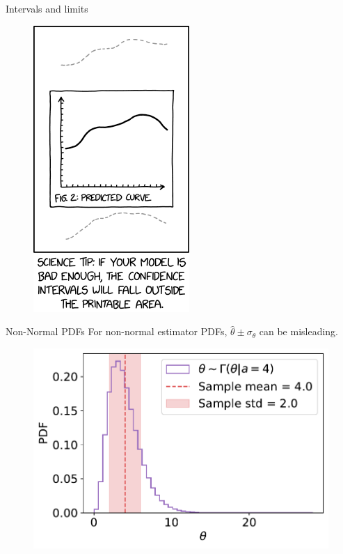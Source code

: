 \documentclass[
aspectratio=169,
14pt,
professionalfonts
]{beamer}
\begin{document}
\begin{frame}{Intervals and limits}
\begin{figure}
    \centering
    \href{https://xkcd.com/}{
    \includegraphics[width=0.25\linewidth]{../plots/confidence_interval.png}
    }
\end{figure}
\end{frame}

\begin{frame}{Non-Normal PDFs}
For non-normal estimator PDFs, $\hat \theta \pm \sigma_\theta$ can be misleading.

\begin{figure}
    \centering
    \includegraphics[width=0.6\linewidth]{../plots/gamma.pdf}
\end{figure}
\end{frame}
\end{document}
